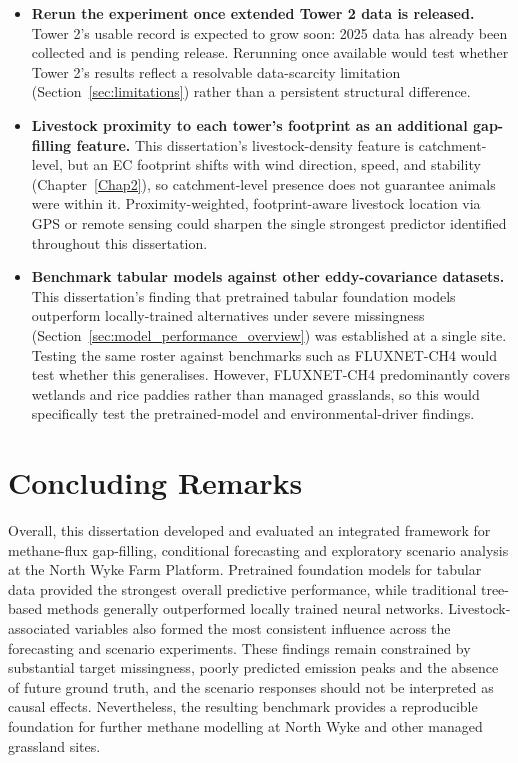 \begin{itemize}
    \item \textbf{Rerun the experiment once extended Tower 2 data is released.} Tower 2's usable
    record is expected to grow soon: 2025 data has already been collected and is pending release.
    Rerunning once available would test whether Tower 2's results reflect a resolvable
    data-scarcity limitation (Section~\ref{sec:limitations}) rather than a persistent structural
    difference.
    \item \textbf{Livestock proximity to each tower's footprint as an additional gap-filling
    feature.} This dissertation's livestock-density feature is catchment-level, but an EC
    footprint shifts with wind direction, speed, and stability (Chapter~\ref{Chap2}), so
    catchment-level presence does not guarantee animals were within it. Proximity-weighted,
    footprint-aware livestock location via GPS or remote sensing could sharpen the single
    strongest predictor identified throughout this dissertation.
    \item \textbf{Benchmark tabular models against other eddy-covariance datasets.} This
    dissertation's finding that pretrained tabular foundation models outperform locally-trained
    alternatives under severe missingness (Section~\ref{sec:model_performance_overview}) was
    established at a single site. Testing the same roster against benchmarks such as FLUXNET-CH4
    \cite{irvin2021} would test whether this generalises. However, FLUXNET-CH4 predominantly
    covers wetlands and rice paddies rather than managed grasslands, so this would specifically test
    the pretrained-model and environmental-driver findings.
\end{itemize}

\section{Concluding Remarks}
Overall, this dissertation developed and evaluated an integrated framework for
methane-flux gap-filling, conditional forecasting and exploratory scenario
analysis at the North Wyke Farm Platform. Pretrained foundation models for
tabular data provided the strongest overall predictive performance, while
traditional tree-based methods generally outperformed locally trained neural
networks. Livestock-associated variables also formed the most consistent
influence across the forecasting and scenario experiments. These findings
remain constrained by substantial target missingness, poorly predicted
emission peaks and the absence of future ground truth, and the scenario
responses should not be interpreted as causal effects. Nevertheless, the
resulting benchmark provides a reproducible foundation for further methane
modelling at North Wyke and other managed grassland sites.
